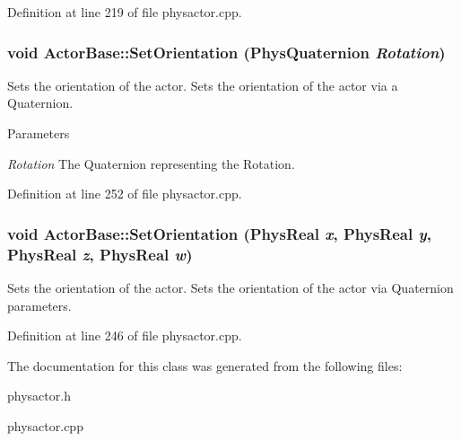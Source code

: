 Definition at line 219 of file physactor.cpp.\hypertarget{classActorBase_a5fe558ca0a88061615cda52a4dc5bf66}{
\subsubsection[{SetOrientation}]{\setlength{\rightskip}{0pt plus 5cm}void ActorBase::SetOrientation ({\bf PhysQuaternion} {\em Rotation})}}
\label{dd/d7b/classActorBase_a5fe558ca0a88061615cda52a4dc5bf66}


Sets the orientation of the actor. Sets the orientation of the actor via a Quaternion. 
\begin{DoxyParams}{Parameters}
\item[{\em Rotation}]The Quaternion representing the Rotation. \end{DoxyParams}


Definition at line 252 of file physactor.cpp.\hypertarget{classActorBase_a9777506815a9840552b30c65d5d70f8d}{
\subsubsection[{SetOrientation}]{\setlength{\rightskip}{0pt plus 5cm}void ActorBase::SetOrientation (PhysReal {\em x}, \/  PhysReal {\em y}, \/  PhysReal {\em z}, \/  PhysReal {\em w})}}
\label{dd/d7b/classActorBase_a9777506815a9840552b30c65d5d70f8d}


Sets the orientation of the actor. Sets the orientation of the actor via Quaternion parameters. 

Definition at line 246 of file physactor.cpp.

The documentation for this class was generated from the following files:\begin{DoxyCompactItemize}
\item 
physactor.h\item 
physactor.cpp\end{DoxyCompactItemize}
